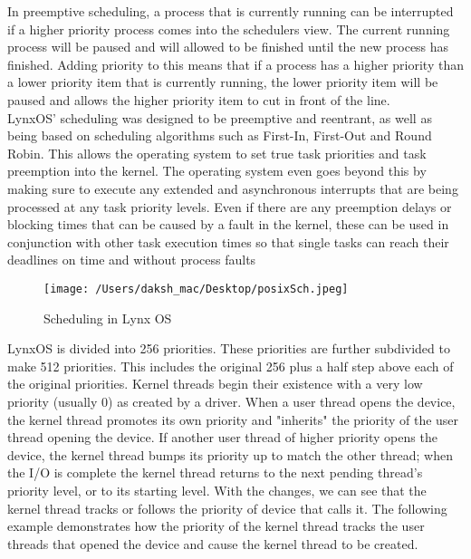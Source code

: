 \documentclass[12pt]{article}
\begin{document}
In preemptive
scheduling, a process that is currently running can be interrupted if a higher priority process
comes into the schedulers view. The current running process will be paused and will allowed to
be finished until the new process has finished. Adding priority to this means that if a process has
a higher priority than a lower priority item that is currently running, the lower priority item will
be paused and allows the higher priority item to cut in front of the line.\\
LynxOS' scheduling was
designed to be preemptive and reentrant, as well as being based on scheduling algorithms such as
First-In, First-Out and Round Robin. This allows the operating system to set true task priorities
and task preemption into the kernel. The operating system even goes beyond this by making sure
to execute any extended and asynchronous interrupts that are being processed at any task priority
levels. Even if there are any preemption delays or blocking times that can be caused by a fault in
the kernel, these can be used in conjunction with other task execution times so that single tasks
can reach their deadlines on time and without process faults

\begin{figure}[H]
	\centering
	\texttt{[image: /Users/daksh\_mac/Desktop/posixSch.jpeg]}
	\caption[About scheduling]{Scheduling in Lynx OS}
	\label{fig:sch}	
\end{figure}

LynxOS is divided into 256
priorities. These priorities are further subdivided to make 512 priorities. This includes
the original 256 plus a half step above each of the original priorities. Kernel threads
begin their existence with a very low priority (usually 0) as created by a driver. When a
user thread opens the device, the kernel thread promotes its own priority and "inherits"
the priority of the user thread opening the device. If another user thread of higher priority
opens the device, the kernel thread bumps its priority up to match the other thread; when
the I/O is complete the kernel thread returns to the next pending thread's priority level, or
to its starting level. With the changes, we can see that the kernel thread tracks or follows
the priority of device that calls it. The following example \cite{ref:seven} demonstrates how the priority
of the kernel thread tracks the user threads that opened the device and cause the kernel
thread to be created.
\end{document}
